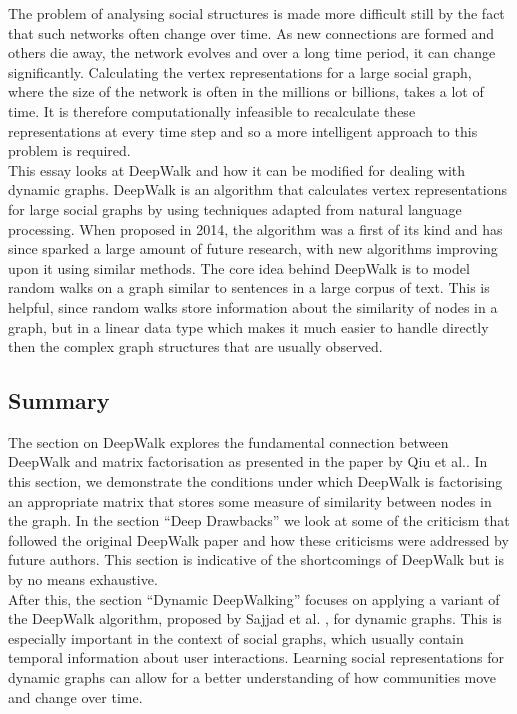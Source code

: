 \documentclass[a4paper]{article}
\begin{document}
The problem of analysing social structures is made more difficult still by the
fact that such networks often change over time. As new connections are formed
and others die away, the network evolves and over a long time period, it can
change significantly. Calculating the vertex representations for a large social
graph, where the size of the network is often in the millions or billions, takes
a lot of time. It is therefore computationally infeasible to recalculate these
representations at every time step and so a more intelligent approach to this
problem is required.\\
This essay looks at DeepWalk\cite{deepwalk} and how it can be modified for dealing with dynamic
graphs. DeepWalk is an algorithm that calculates vertex representations for
large social graphs by using techniques adapted from natural language processing. When proposed in 2014,
 the algorithm was a first of its kind and has since sparked a large amount of future research, with new
algorithms improving upon it using similar methods. The core idea behind DeepWalk is to model random walks
on a graph similar to sentences in a large corpus of text. This is helpful, since random walks store information
about the similarity of nodes in a graph, but in a linear data type which makes it much easier to handle directly then the
complex graph structures that are usually observed.


\subsection{Summary}
The section on DeepWalk explores the fundamental connection between DeepWalk and
matrix factorisation as presented in the paper by Qiu et al.\cite{qiu2018}. In
this section, we demonstrate the conditions under which DeepWalk is factorising
an appropriate matrix that stores some measure of similarity between
nodes in the graph. In the section ``Deep Drawbacks'' we look at some of the
criticism that followed the original DeepWalk paper and how these criticisms
were addressed by future authors. This section is indicative of the shortcomings
of DeepWalk but is by no means exhaustive.\\
After this, the section ``Dynamic DeepWalking'' focuses on applying a variant of the DeepWalk algorithm, proposed
by Sajjad et al. \cite{sajjad2019}, for dynamic graphs. This is especially
important in the context of social graphs, which usually contain temporal information
about user interactions. Learning social
representations for dynamic graphs can allow for a better understanding of how
communities move and change over time.\\
\end{document}
